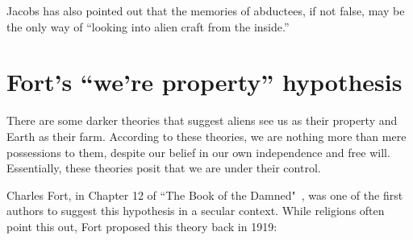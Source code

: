Jacobs has also pointed out that the memories of abductees, if not false, may be the only way of ``looking into alien craft from the inside.''

\section{Fort's ``we're property'' hypothesis}
\label{2023-UFO-part-Perception-abductions-wao}

There are some darker theories that suggest aliens see us as their property and Earth as their farm. According to these theories, we are nothing more than mere possessions to them, despite our belief in our own independence and free will. Essentially, these theories posit that we are under their control.

Charles Fort, in Chapter 12 of ``The Book of the Damned"~\cite{FortBotD,Fort1975-vd}, was one of the first authors to suggest this hypothesis in a secular context. While religions often point this out, Fort proposed this theory back in 1919:
